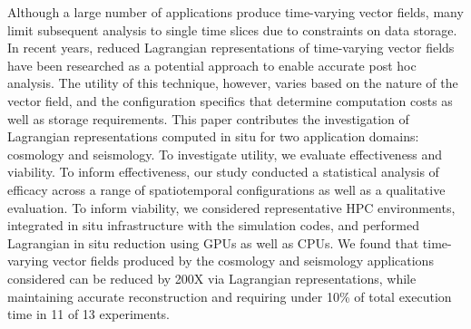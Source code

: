 Although a large number of applications produce time-varying vector fields, many limit subsequent analysis to single time slices due to constraints on data storage.
%
In recent years, reduced Lagrangian representations of time-varying vector fields have been researched as a potential approach to enable accurate post hoc analysis.
%
The utility of this technique, however, varies based on the nature of the vector field, and the configuration specifics that determine computation costs as well as storage requirements.
%
This paper contributes the investigation of Lagrangian representations computed in situ for two application domains: cosmology and seismology.
%
%
To investigate utility, we evaluate effectiveness and viability. 
%
To inform effectiveness, our study conducted a statistical analysis of efficacy across a range of spatiotemporal configurations as well as a qualitative evaluation. %
%
To inform viability, we considered representative HPC environments, integrated in situ infrastructure with the simulation codes, and performed Lagrangian in situ reduction using GPUs as well as CPUs.
%
We found that time-varying vector fields produced by the cosmology and seismology applications considered can be reduced by 200X via Lagrangian representations, while maintaining accurate reconstruction and requiring under 10\% of total execution time in 11 of 13 experiments.
%
%
%
%

